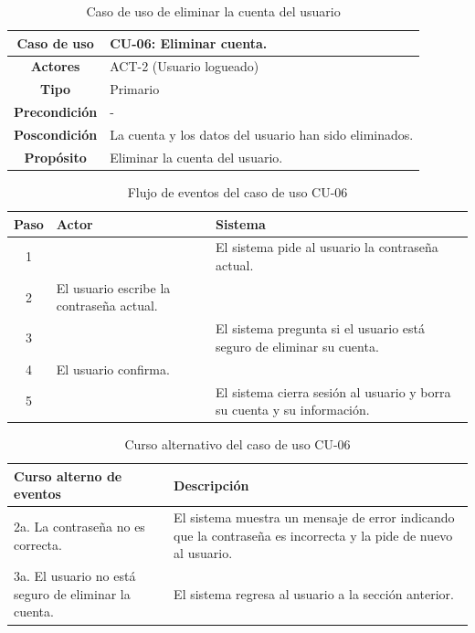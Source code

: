 \begin{table}[H]
\centering
\begin{tabular}{|c|p{10cm}|}
\hline
\rowcolor{green!40} \textbf{Caso de uso} & CU-06: Eliminar cuenta. \\ \hline
\rowcolor{blue!10} \textbf{Actores} & ACT-2 (Usuario logueado) \\ \hline
\rowcolor{blue!10} \textbf{Tipo} & Primario \\ \hline
\rowcolor{blue!10} \textbf{Precondición} & - \\ \hline
\rowcolor{blue!10} \textbf{Poscondición} & La cuenta y los datos del usuario han sido eliminados. \\ \hline
\rowcolor{blue!10} \textbf{Propósito} & Eliminar la cuenta del usuario. \\ \hline
\end{tabular}
\caption{Caso de uso de eliminar la cuenta del usuario}
\end{table}

\begin{table}[H]
\centering
\begin{tabular}{|c|p{5cm}|p{5cm}|}
\hline
\rowcolor{green!40} \textbf{Paso} & \textbf{Actor} & \textbf{Sistema} \\ \hline
\rowcolor{blue!10} 1 &  & El sistema pide al usuario la contraseña actual. \\ \hline
\rowcolor{blue!10} 2 & El usuario escribe la contraseña actual. & \\ \hline
\rowcolor{blue!10} 3 &  & El sistema pregunta si el usuario está seguro de eliminar su cuenta. \\ \hline
\rowcolor{blue!10} 4 & El usuario confirma. & \\ \hline
\rowcolor{blue!10} 5 &  & El sistema cierra sesión al usuario y borra su cuenta y su información. \\ \hline
\end{tabular}
\caption{Flujo de eventos del caso de uso CU-06}
\end{table}

\begin{table}[H]
\centering
\begin{tabular}{|p{4cm}|p{8cm}|}
\hline
\rowcolor{green!40} \textbf{Curso alterno de eventos} & \textbf{Descripción} \\ \hline
\rowcolor{blue!10} 2a. La contraseña no es correcta. & El sistema muestra un mensaje de error indicando que la contraseña es incorrecta y la pide de nuevo al usuario. \\ \hline
\rowcolor{blue!10} 3a. El usuario no está seguro de eliminar la cuenta. & El sistema regresa al usuario a la sección anterior. \\ \hline
\end{tabular}
\caption{Curso alternativo del caso de uso CU-06}
\end{table}

